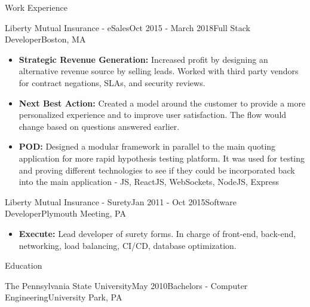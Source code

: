 \documentclass{resume} %
\begin{document}
\begin{rSection}{Work Experience}
\begin{rSubsection}{Liberty Mutual Insurance - eSales}{Oct 2015 - March 2018}{Full Stack Developer}{Boston, MA}
\begin{itemize}
    \item \textbf{Strategic Revenue Generation:} Increased profit by designing an alternative revenue source by selling leads. Worked with third party vendors for contract negations, SLAs, and security reviews.
    \item \textbf{Next Best Action:} Created a model around the customer to provide a more personalized experience and to improve user satisfaction. The flow would change based on questions answered earlier.
    \item \textbf{POD:} Designed a modular framework in parallel to the main quoting application for more rapid hypothesis testing platform. It was used for testing and proving different technologies to see if they could be incorporated back into the main application - JS, ReactJS, WebSockets, NodeJS, Express
\end{itemize}
\end{rSubsection}

\begin{rSubsection}{Liberty Mutual Insurance - Surety}{Jan 2011 - Oct 2015}{Software Developer}{Plymouth Meeting, PA}
\begin{itemize}
    \item \textbf{Execute:} Lead developer of surety forms. In charge of front-end, back-end, networking, load balancing, CI/CD, database optimization. 
\end{itemize}
\end{rSubsection}
\end{rSection}


\begin{rSection}{Education}
\begin{rSubsection}{The Pennsylvania State University}{May 2010}{Bachelors - Computer Engineering}{University Park, PA}

\end{rSubsection}
\end{rSection}
\end{document}
